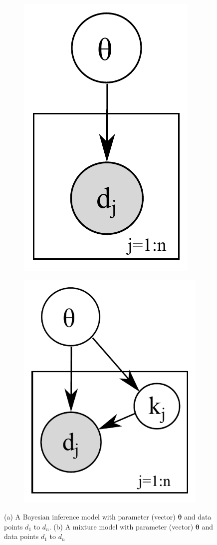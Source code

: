 \documentclass[letterpaper]{article}
\begin{document}
\begin{figure}
\centering
\begin{subfigure}{.45\linewidth} %
\centering
\includegraphics[width=.56\textwidth]{pic/naive.pdf}
\caption{}
\label{fig:naive}
\end{subfigure}
\begin{subfigure}{.45\linewidth}
\centering
  \includegraphics[width=.70\textwidth]{pic/naive-mix2.pdf}
\caption{}
\label{fig:naive.mix}
\end{subfigure}
\vspace{-3mm}
\caption{\footnotesize 
(a) A Bayesian inference model with parameter (vector) $\boldsymbol\theta$ and data points $d_1$ to $d_n$.
(b) A mixture model with parameter (vector) $\boldsymbol\theta$ and data points $d_1$ to $d_n$ 
}
\vspace{-5mm}
\end{figure}
\end{document}
